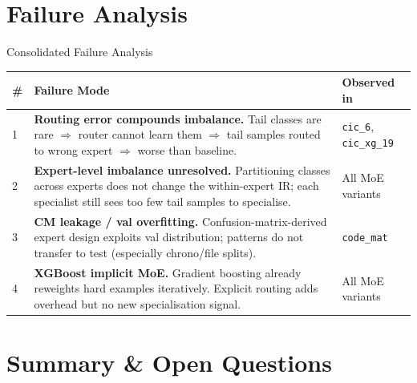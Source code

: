 \documentclass[aspectratio=169,10pt]{beamer}
\begin{document}
\section{Failure Analysis}

\begin{frame}{Consolidated Failure Analysis}
  \renewcommand{\arraystretch}{1.35}
  \footnotesize
  \begin{tabular}{lp{5.8cm}p{4.0cm}}
    \toprule
    \textbf{\#} & \textbf{Failure Mode} & \textbf{Observed in} \\
    \midrule
    1 &
    \textbf{Routing error compounds imbalance.}
    Tail classes are rare $\Rightarrow$ router cannot learn them $\Rightarrow$
    tail samples routed to wrong expert $\Rightarrow$ worse than baseline. &
    \texttt{cic\_6}, \texttt{cic\_xg\_19} \\[4pt]
    2 &
    \textbf{Expert-level imbalance unresolved.}
    Partitioning classes across experts does not change the within-expert IR;
    each specialist still sees too few tail samples to specialise. &
    All MoE variants \\[4pt]
    3 &
    \textbf{CM leakage / val overfitting.}
    Confusion-matrix-derived expert design exploits val distribution;
    patterns do not transfer to test (especially chrono/file splits). &
    \texttt{code\_mat} \\[4pt]
    4 &
    \textbf{XGBoost implicit MoE.}
    Gradient boosting already reweights hard examples iteratively.
    Explicit routing adds overhead but no new specialisation signal. &
    All MoE variants \\
    \bottomrule
  \end{tabular}
\end{frame}

\section{Summary \& Open Questions}
\end{document}
